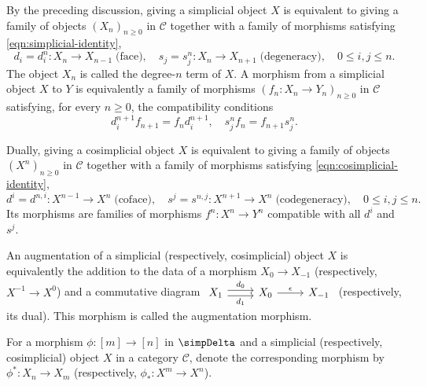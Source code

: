 By the preceding discussion, giving a simplicial object $X$ is equivalent to
giving a family of objects $(X_n)_{n\geq0}$ in $\mathcal{C}$ together with a
family of morphisms satisfying \eqref{eqn:simplicial-identity},
\[ d_i = d^n_i: X_n \to X_{n-1} \; \text{(face)}, \quad s_j = s^n_j: X_n \to X_{n+1} \; \text{(degeneracy)}, \quad 0 \leq i, j \leq n. \]
The object $X_n$ is called the degree-$n$ term of $X$. A morphism from a
simplicial object $X$ to $Y$ is equivalently a family of morphisms
$(f_n:X_n\to Y_n)_{n\geq0}$ in $\mathcal{C}$ satisfying, for every $n\geq0$,
the compatibility conditions
\[ d^{n+1}_i f_{n+1} = f_n d^{n+1}_i, \quad s^n_j f_n = f_{n+1} s^n_j . \]

Dually, giving a cosimplicial object $X$ is equivalent to giving a family of
objects $(X^n)_{n\geq0}$ in $\mathcal{C}$ together with a family of morphisms
satisfying \eqref{eqn:cosimplicial-identity},
\[ d^i = d^{n, i}: X^{n-1} \to X^n \; \text{(coface)}, \quad s^j = s^{n, j}: X^{n+1} \to X^n \; \text{(codegeneracy)}, \quad 0 \leq i, j \leq n. \]
Its morphisms are families of morphisms $f^n:X^n\to Y^n$ compatible with
all $d^i$ and $s^j$.

An augmentation of a simplicial (respectively, cosimplicial) object $X$ is
equivalently the addition to the data of a morphism $X_0\to X_{-1}$
(respectively, $X^{-1}\to X^0$) and a commutative diagram
$\begin{tikzcd}
	X_1 \arrow[shift left, r, "d_0"] \arrow[shift right, r, "d_1"'] & X_0 \arrow[r, "\epsilon"] & X_{-1}
\end{tikzcd}$
(respectively, its dual). This morphism is called the augmentation morphism.

\begin{convention}
	For a morphism $\phi:[m]\to[n]$ in $\simpDelta$ and a simplicial
	(respectively, cosimplicial) object $X$ in a category $\mathcal{C}$, denote
	the corresponding morphism by $\phi^*:X_n\to X_m$ (respectively,
	$\phi_*:X^m\to X^n$).
\end{convention}

